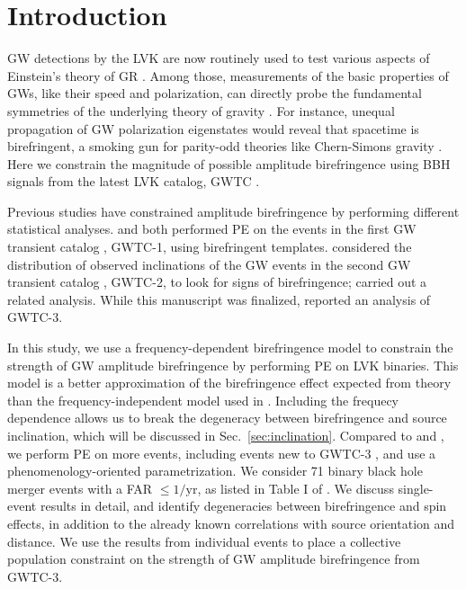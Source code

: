 \documentclass[aps,prd,twocolumn,superscriptaddress,preprintnumbers,nofootinbib]{revtex4-2}
\begin{document}
\section{Introduction}
\label{sec:Introduction}
\Ac{GW} detections by the \ac{LVK} \citep{LIGO, Virgo, KAGRA} are now routinely used to test various aspects of Einstein's theory of \ac{GR} \citep{LIGOScientific:2016lio,LIGOScientific:2018dkp,LIGOScientific:2021sio}.
Among those, measurements of the basic properties of \acp{GW}, like their speed and polarization, can directly probe the fundamental symmetries of the underlying theory of gravity \citep{Will:2018bme}.
For instance, unequal propagation of \ac{GW} polarization eigenstates would reveal that spacetime is birefringent, a smoking gun for parity-odd theories like Chern-Simons gravity \citep{Lue:1998mq,Jackiw:2003pm,Alexander:2009tp,Sopuerta:2009iy}.
Here we constrain the magnitude of possible amplitude birefringence using \ac{BBH} signals from the latest \ac{LVK} catalog, GWTC \citep{GWTC-3}.

Previous studies have constrained amplitude birefringence by performing different statistical analyses.
\citet{Yamada_2020} and \citet{Wang_2021} both performed \ac{PE} on the events in the first \ac{GW} transient catalog \citep{GWTC-1}, GWTC-1, using birefringent templates.
\citet{Okounkova_2022} considered the distribution of observed inclinations of the \ac{GW} events in the second \ac{GW} transient catalog \citep{GWTC-2}, GWTC-2, to look for signs of birefringence; \citet{Vitale:2022pmu} carried out a related analysis.
While this manuscript was finalized, \citet{Zhu:2023wci} reported an analysis of GWTC-3.

In this study, we use a frequency-dependent birefringence model to constrain the strength of \ac{GW} amplitude birefringence by performing \ac{PE} on \ac{LVK} binaries.
This model is a better approximation of the birefringence effect expected from theory than the frequency-independent model used in \citet{Okounkova_2022}.
Including the frequecy dependence allows us to break the degeneracy between birefringence and source inclination, which will be discussed in Sec.~\ref{sec:inclination}.
Compared to \citet{Yamada_2020,Wang_2021} and \citet{Okounkova_2022}, we perform \ac{PE} on more events, including events new to GWTC-3 \citep{GWTC-3}, and use a phenomenology-oriented parametrization.
We consider 71 binary black hole merger events with a \ac{FAR} $\leq1/\mathrm{yr}$, as listed in Table I of \citet{GWTC-3_population}.
We discuss single-event results in detail, and identify degeneracies between birefringence and spin effects, in addition to the already known correlations with source orientation and distance.
We use the results from individual events to place a collective population constraint on the strength of \ac{GW} amplitude birefringence from GWTC-3.
\end{document}
